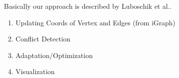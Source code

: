 Basically our approach is described by Luboschik et al.\cite{RN38}.

\begin{enumerate}
    \item Updating Coords of Vertex and Edges (from iGraph)
    \item Conflict Detection
    \item Adaptation/Optimization
    \item Visualization
\end{enumerate}